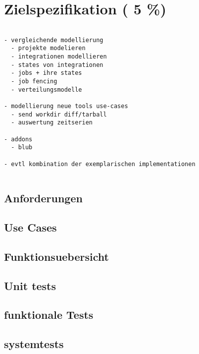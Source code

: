 \chapter{Zielspezifikation ( 5 \%)}

\begin{verbatim}

- vergleichende modellierung
  - projekte modelieren
  - integrationen modellieren
  - states von integrationen
  - jobs + ihre states
  - job fencing
  - verteilungsmodelle

- modellierung neue tools use-cases
  - send workdir diff/tarball
  - auswertung zeitserien

- addons
  - blub

- evtl kombination der exemplarischen implementationen


\end{verbatim}

\section{Anforderungen}
\section{Use Cases}
\section{Funktionsuebersicht}
\section{Unit tests}
\section{funktionale Tests}
\section{systemtests}


